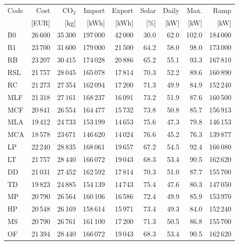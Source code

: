 \clearpage
\noindent\begin{minipage}{\textwidth}\singlespacing\captionsetup{font=footnotesize}
\setlength{\tabcolsep}{4pt}
\renewcommand{\arraystretch}{1.0}
\label{tab:full-scorecard-2-0}
\fontsize{8}{9}\selectfont
\begin{tabular*}{\textwidth}{@{\extracolsep{\fill}}lrrrrrrrr@{}}
\toprule
Code & Cost & CO$_2$ & Import & Export & Solar & Daily & Max. & Ramp\\
 & [EUR] & [kg] & [kWh] & [kWh] & [\%] & [kW] & [kW] & [kW]\\
\midrule
B0 & 26\,600 & 35\,300 & 197\,000 & 42\,000 & 30.0 & 62.0 & 102.0 & 184\,000\\
B1 & 23\,700 & 31\,600 & 179\,000 & 21\,500 & 64.2 & 58.0 & 98.0 & 173\,000\\
RB & 23\,207 & 30\,415 & 174\,028 & 20\,886 & 65.2 & 55.1 & 93.3 & 167\,810\\
RSL & 21\,757 & 28\,045 & 165\,078 & 17\,814 & 70.3 & 52.2 & 89.6 & 160\,890\\
RC & 21\,273 & 27\,354 & 162\,094 & 17\,200 & 71.3 & 49.9 & 84.9 & 152\,240\\
MLF & 21\,318 & 27\,161 & 168\,237 & 16\,091 & 73.2 & 51.9 & 87.6 & 160\,500\\
MCF & 20\,841 & 26\,554 & 164\,477 & 15\,732 & 73.8 & 50.8 & 85.7 & 156\,913\\
MLA & 19\,412 & 24\,733 & 153\,199 & 14\,653 & 75.6 & 47.3 & 79.8 & 146\,153\\
MCA & 18\,578 & 23\,671 & 146\,620 & 14\,024 & 76.6 & 45.2 & 76.3 & 139\,877\\
LP & 22\,240 & 28\,835 & 168\,061 & 19\,657 & 67.2 & 54.5 & 92.4 & 166\,080\\
LT & 21\,757 & 28\,440 & 166\,072 & 19\,043 & 68.3 & 53.4 & 90.5 & 162\,620\\
DD & 21\,031 & 27\,452 & 162\,592 & 17\,814 & 70.3 & 51.0 & 87.7 & 155\,700\\
TD & 19\,823 & 24\,885 & 154\,139 & 14\,743 & 75.4 & 47.6 & 80.3 & 147\,050\\
MP & 20\,790 & 26\,564 & 160\,106 & 16\,586 & 72.4 & 49.9 & 85.9 & 153\,970\\
HP & 20\,548 & 26\,169 & 158\,614 & 15\,971 & 73.4 & 49.3 & 84.0 & 152\,240\\
MS & 20\,790 & 26\,761 & 161\,100 & 17\,200 & 71.3 & 50.5 & 86.8 & 155\,700\\
OF & 21\,394 & 28\,440 & 166\,072 & 19\,043 & 68.3 & 53.4 & 90.5 & 162\,620\\

\end{tabular*}
\end{minipage}
